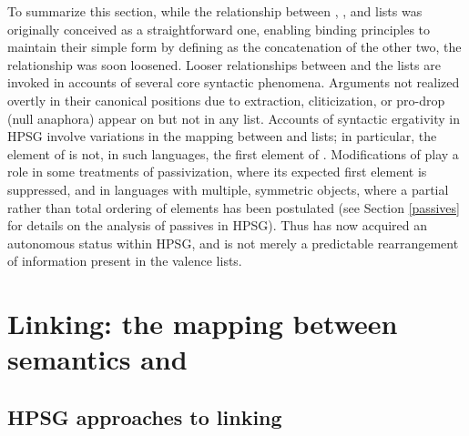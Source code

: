 \documentclass[output=paper
	        ,collection
	        ,collectionchapter
 	        ,biblatex
                ,babelshorthands
                ,newtxmath
                ,draftmode
                ,colorlinks, citecolor=brown
]{langscibook}
\begin{document}
To summarize this section, while the relationship between \argst, \subj, and \comps lists was originally conceived as a straightforward one, enabling binding principles to maintain their simple form by defining \argst as the concatenation of the other two, the relationship was soon loosened.
Looser
relationships between \argst and the \val lists are invoked in accounts of several core syntactic phenomena.
Arguments not realized overtly in their canonical positions 
due to extraction, cliticization, or pro-drop (null anaphora) appear on \argst but not in any \val list.  
Accounts of syntactic ergativity in HPSG involve variations in the mapping between \argst and \val lists; in particular, the element of \subj is not, in such languages, the first element of \argst.  
Modifications of \argst play a role in some treatments of passivization, where its expected first element is suppressed, and in languages with multiple, symmetric objects, where a partial rather than total ordering of \argst elements has been postulated (see Section \ref{passives} for details on the analysis of passives in HPSG).
Thus \argst has now acquired an autonomous %
status within HPSG, and is not merely a predictable rearrangement of information present in the valence lists.  


\section{Linking: the mapping between semantics and \argst}
\label{linking-sec}

\subsection{HPSG approaches to linking}
\end{document}
